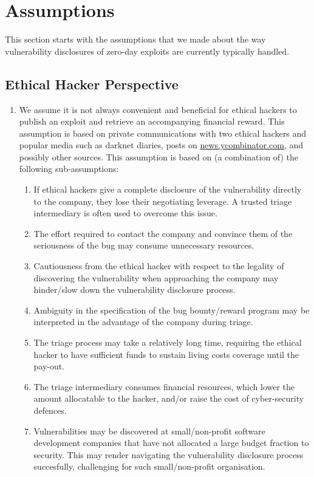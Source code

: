 \section{Assumptions}\label{sec:assumptions}
This section starts with the assumptions that we made about the way vulnerability disclosures of zero-day exploits are currently typically handled.

\subsection{Ethical Hacker Perspective}
\begin{enumerate}
	\item We assume it is not always convenient and beneficial for ethical hackers to publish an exploit and retrieve an accompanying financial reward. This assumption is based on private communications with two ethical hackers %
	and popular media such as darknet diaries, posts on \url{news.ycombinator.com},  and possibly other sources. %
	This assumption is based on (a combination of) the following sub-assumptions:
	\begin{enumerate}
		\item If ethical hackers give a complete disclosure of the vulnerability directly to the company, they lose their negotiating leverage. A trusted triage intermediary is often used to overcome this issue.
		\item The effort required to contact the company and convince them of the seriousness of the bug may consume unnecessary resources.
		\item Cautiousness from the ethical hacker with respect to the legality of discovering the vulnerability when approaching the company  may hinder/slow down the vulnerability disclosure process.
		\item Ambiguity in the specification of the bug bounty/reward program may be interpreted in the advantage of the company during triage.
		\item The triage process may take a relatively long time, requiring the ethical hacker to have sufficient funds to sustain living costs coverage until the pay-out.
		\item The triage intermediary consumes financial resources, which lower the amount allocatable to the hacker, and/or raise the cost of cyber-security defences.
		\item Vulnerabilities may be discovered at small/non-profit software development companies that have not allocated a large budget fraction to security. This may render navigating the vulnerability disclosure process succesfully, challenging for such small/non-profit organisation.
	\end{enumerate}
\end{enumerate}

